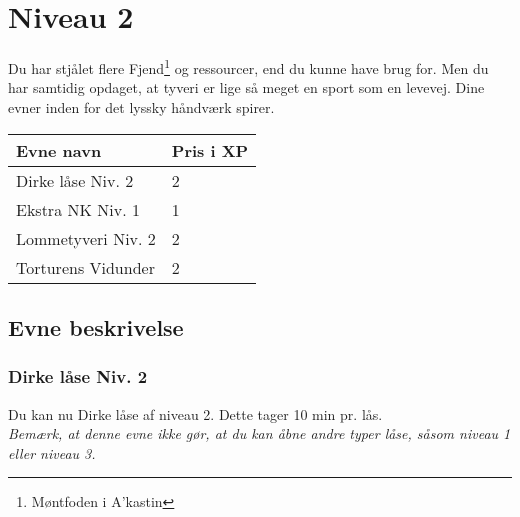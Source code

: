 \chapter{Niveau 2}
Du har stjålet flere Fjend\footnote{Møntfoden i A'kastin} og ressourcer, end du kunne have brug for. Men du har samtidig opdaget, at tyveri er lige så meget en sport som en levevej. Dine evner inden for det lyssky håndværk spirer.

\begin{table}[H]
    \centering
    \begin{tabular}{|p{}|p{}|}
    \rowcolor{cerulean!80}\hline
        Evne navn & Pris i XP \\\hline
         Dirke låse Niv. 2 & 2 \\\hline
         Ekstra NK Niv. 1 & 1 \\\hline
         Lommetyveri Niv. 2 & 2 \\\hline
         Torturens Vidunder & 2 \\
         \hline
    \end{tabular}
\end{table}
\section{Evne beskrivelse}

\subsection{Dirke låse Niv. 2}
Du kan nu Dirke låse af niveau 2. Dette tager 10 min pr. lås.\\
\emph{Bemærk, at denne evne ikke gør, at du kan åbne andre typer låse, såsom niveau 1 eller niveau 3.}\\





